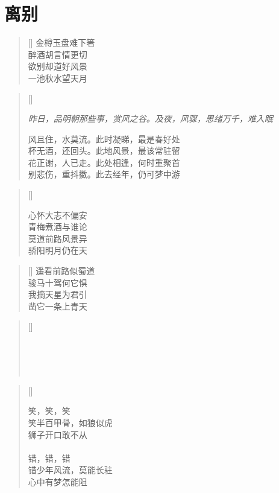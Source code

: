 \chapter{离别}
\thispagestyle{empty}
\renewcommand{\poemtoc}{section}
\settowidth{\versewidth}{秋风不知离别味}
\begin{verse}[\versewidth]
金樽玉盘难下箸\\
醉酒胡言情更切\\
欲别却道好风景\\
一池秋水望天月
\end{verse}

\renewcommand{\poemtoc}{section}
\settowidth{\versewidth}{风且住，水莫流，此时凝睇，最是春好处}
\begin{verse}[\versewidth]

\emph{\scriptsize{昨日，品明朝那些事，赏风之谷。及夜，风骤，思绪万千，难入眠}}

风且住，水莫流。此时凝睇，最是春好处\\
杯无酒，还回头。此地风景，最该常驻留\\
花正谢，人已走。此处相逢，何时重聚首\\
别悲伤，重抖擞。此去经年，仍可梦中游\\
\end{verse}

\renewcommand{\poemtoc}{section}
\settowidth{\versewidth}{心怀大志不偏安}
\begin{verse}[\versewidth]

心怀大志不偏安\\
青梅煮酒与谁论\\
莫道前路风景异\\
骄阳明月仍在天
\end{verse}

\renewcommand{\poemtoc}{section}
\settowidth{\versewidth}{心怀大志不偏安}
\begin{verse}[\versewidth]
遥看前路似蜀道\\
骏马十驾何它惧\\
我摘天星为君引\\
凿它一条上青天
\end{verse}
\newpage

\renewcommand{\poemtoc}{section}
\settowidth{\versewidth}{MOS数载功勋卓}
\begin{verse}[\versewidth]

\\
\\
\\
\end{verse}

\renewcommand{\poemtoc}{section}
\settowidth{\versewidth}{MOS数载功勋卓}
\begin{verse}[\versewidth]

笑，笑，笑\\
笑半百甲骨，如狼似虎\\
狮子开口敢不从\\
~\\
错，错，错\\
错少年风流，莫能长驻\\
心中有梦怎能阻\\
\end{verse}

